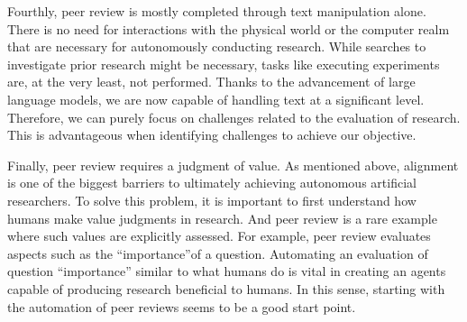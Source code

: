 

Fourthly, peer review is mostly completed through text manipulation alone. There is no need for interactions with the physical world or the computer realm that are necessary for autonomously conducting research. While searches to investigate prior research might be necessary, tasks like executing experiments are, at the very least, not performed. Thanks to the advancement of large language models, we are now capable of handling text at a significant level. Therefore, we can purely focus on challenges related to the evaluation of research. This is advantageous when identifying challenges to achieve our objective.


Finally, peer review requires a judgment of value. As mentioned above, alignment is one of the biggest barriers to ultimately achieving autonomous artificial researchers. To solve this problem, it is important to first understand how humans make value judgments in research. And peer review is a rare example where such values are explicitly assessed. For example, peer review evaluates aspects such as the ``importance''of a question. Automating an evaluation of question ``importance'' similar to what humans do is vital in creating an agents capable of producing research beneficial to humans. In this sense, starting with the automation of peer reviews seems to be a good start point.


